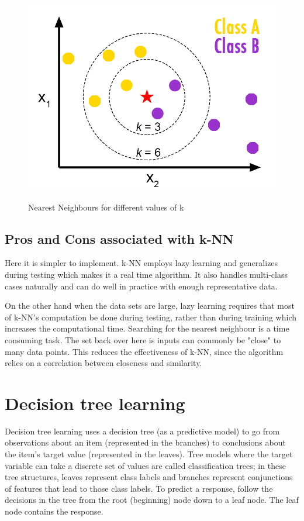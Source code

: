 \begin{figure}[H]
\centering
{\includegraphics[scale=0.60]{knn.png}}
\caption{Nearest Neighbours for different values of k}
\end{figure}


\subsection{Pros and Cons associated with k-NN} \label{Pros and Cons associated with k-NN}
\noindent Here it is simpler to implement. k-NN employs lazy learning and generalizes during testing which makes it a real time algorithm. It also handles multi-class cases naturally and can do well in practice with enough representative data. 

\noindent On the other hand when the data sets are large, lazy learning requires that most of k-NN's computation be done during testing, rather than during training which increases the computational time. Searching for the nearest neighbour is a time consuming task. The set back over here is inputs can commonly be "close" to many data points. This reduces the effectiveness of k-NN, since the algorithm relies on a correlation between closeness and similarity.

\newpage

\section{Decision tree learning} \label{Decision tree learning}

\noindent Decision tree learning uses a decision tree (as a predictive model) to go from observations about an item (represented in the branches) to conclusions about the item's target value (represented in the leaves). Tree models where the target variable can take a discrete set of values are called classification trees; in these tree structures, leaves represent class labels and branches represent conjunctions of features that lead to those class labels. To predict a response, follow the decisions in the tree from the root (beginning) node down to a leaf node. The leaf node contains the response.



